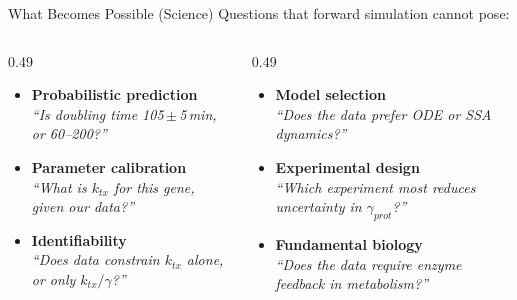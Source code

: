 \documentclass[aspectratio=169]{beamer}
\begin{document}
\begin{frame}{What Becomes Possible (Science)}
	\small
	Questions that forward simulation cannot pose:
	\smallskip
	\begin{columns}[T]

		\begin{column}{0.49\textwidth}
			\begin{itemize}\itemsep3pt\parskip0pt
				\item \textbf{Probabilistic prediction}\\[1pt]
				{\scriptsize\itshape ``Is doubling time 105\,$\pm$\,5\,min, or 60--200?''}
				\item \textbf{Parameter calibration}\\[1pt]
				{\scriptsize\itshape ``What is $k_{tx}$ for this gene, given our data?''}
				\item \textbf{Identifiability}\\[1pt]
				{\scriptsize\itshape ``Does data constrain $k_{tx}$ alone, or only $k_{tx}/\gamma$?''}
			\end{itemize}
		\end{column}
		\begin{column}{0.49\textwidth}
			\begin{itemize}\itemsep3pt\parskip0pt
				\item \textbf{Model selection}\\[1pt]
				{\scriptsize\itshape ``Does the data prefer ODE or SSA dynamics?''}
				\item \textbf{Experimental design}\\[1pt]
				{\scriptsize\itshape ``Which experiment most reduces uncertainty in $\gamma_{prot}$?''}
				\item \textbf{Fundamental biology}\\[1pt]
				{\scriptsize\itshape ``Does the data require enzyme feedback in metabolism?''}
			\end{itemize}
		\end{column}
	\end{columns}


\end{frame}
\end{document}
